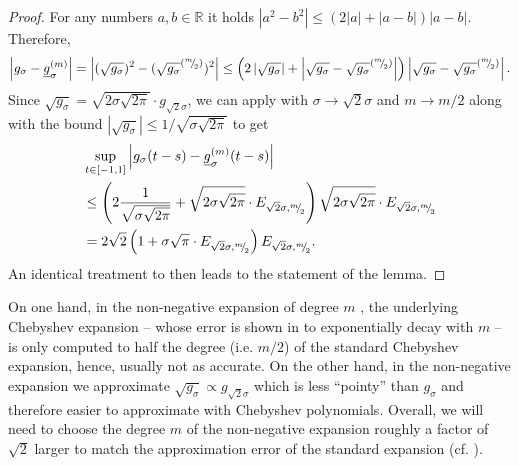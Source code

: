 \begin{proof}
    For any numbers $a, b \in \mathbb{R}$ it holds $| a^2 - b^2 | \leq (2 | a | + | a - b |)  | a - b |$. Therefore,
    \begin{equation}
        \left| g_{\sigma} - \underline{g}_{\sigma}^{(m)} \right| = \left| (\sqrt{g_{\sigma}})^2 - (\sqrt{g_{\sigma}}^{({}^{m}{\mskip -5mu/\mskip -3mu}_{2})})^2 \right| \leq \left( 2 \left| \sqrt{g_{\sigma}} \right| + \left| \sqrt{g_{\sigma}} - \sqrt{g_{\sigma}}^{({}^{m}{\mskip -5mu/\mskip -3mu}_{2})} \right| \right) \left| \sqrt{g_{\sigma}} - \sqrt{g_{\sigma}}^{({}^{m}{\mskip -5mu/\mskip -3mu}_{2})} \right|.
    \end{equation}
    Since $\sqrt{g_{\sigma}} = \sqrt{2 \sigma \sqrt{2 \pi}} \cdot g_{\sqrt{2}\sigma}$, we can apply  with $\sigma \to \sqrt{2}\sigma$ and $m \to m/2$ along with the bound $|\sqrt{g_{\sigma}}| \leq 1/\sqrt{\sigma \sqrt{2 \pi}}$ to get
    \begin{align}
        &\sup_{t \in [-1, 1]} \left| g_{\sigma}(t - s) - \underline{g}_{\sigma}^{(m)}(t - s) \right| \notag \\
        &\leq \left( 2 \frac{1}{\sqrt{ \sigma \sqrt{2\pi}}} + \sqrt{2 \sigma \sqrt{2 \pi}} \cdot E_{\sqrt{2}\sigma, {}^{m}{\mskip -5mu/\mskip -3mu}_{2}}\right)\sqrt{2 \sigma \sqrt{2 \pi}} \cdot E_{\sqrt{2}\sigma, {}^{m}{\mskip -5mu/\mskip -3mu}_{2}} \notag \\
        &= 2\sqrt{2} \left(1 + \sigma \sqrt{\pi} \cdot E_{\sqrt{2}\sigma, {}^{m}{\mskip -5mu/\mskip -3mu}_{2}}\right) E_{\sqrt{2}\sigma, {}^{m}{\mskip -5mu/\mskip -3mu}_{2}}.
    \end{align}
    An identical treatment to  then leads to the statement of the lemma.
\end{proof}

On one hand, in the non-negative expansion of degree $m$ , the underlying Chebyshev expansion -- whose error is shown in  to exponentially decay with $m$ -- is only computed to half the degree (i.e. $m/2$) of the standard Chebyshev expansion, hence, usually not as accurate. On the other hand, in the non-negative expansion we approximate $\sqrt{g_{\sigma}} \propto g_{\sqrt{2}\sigma}$ which is less \enquote{pointy} than $g_{\sigma}$ and therefore easier to approximate with Chebyshev polynomials. Overall, we will need to choose the degree $m$ of the non-negative expansion roughly a factor of $\sqrt{2}$ larger to match the approximation error of the standard expansion (cf. ).

